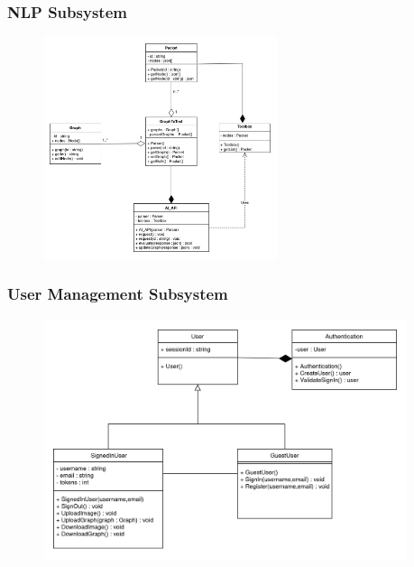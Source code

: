 \documentclass[11pt,a4paper]{article}
\begin{document}
\subsubsection*{NLP Subsystem}
\begin{figure}[htbp]
    \centering
    \href{https://drive.google.com/drive/u/2/folders/1rnYMSGTOmKY8_pOyJUIacjTxuubO_6NX}
    {\includegraphics[width=0.61\textwidth]{../diagramPng/Graph Parsing-Subsystem.png}}
\end{figure}

\pagebreak
{}
\subsubsection*{User Management Subsystem}
\begin{figure}[htbp]
    \centering
    \href{https://drive.google.com/drive/u/2/folders/1rnYMSGTOmKY8_pOyJUIacjTxuubO_6NX}
    {\includegraphics[width=0.95\textwidth]{../diagramPng/User-Subsystem.png}}
\end{figure}
\end{document}
